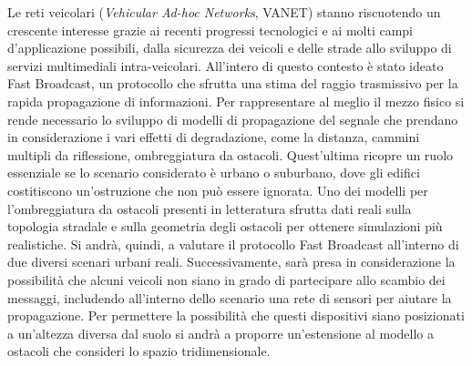 
Le reti veicolari (\textit{Vehicular Ad-hoc Networks}, VANET) stanno riscuotendo un crescente interesse
grazie ai recenti progressi tecnologici e ai molti campi d'applicazione possibili, dalla sicurezza dei veicoli
e delle strade allo sviluppo di servizi multimediali intra-veicolari.
All'intero di questo contesto è stato ideato Fast Broadcast,
un protocollo che sfrutta una stima del raggio trasmissivo per la rapida propagazione di informazioni.
Per rappresentare al meglio il mezzo fisico si rende necessario lo sviluppo di modelli di propagazione del segnale
che prendano in considerazione i vari effetti di degradazione, come la distanza, cammini multipli da riflessione, ombreggiatura da ostacoli.
Quest'ultima ricopre un ruolo essenziale se lo scenario considerato è urbano o suburbano,
dove gli edifici costitiscono un'ostruzione che non può essere ignorata.
Uno dei modelli per l'ombreggiatura da ostacoli presenti in letteratura
sfrutta dati reali sulla topologia stradale e sulla geometria degli ostacoli per ottenere simulazioni più realistiche.
Si andrà, quindi, a valutare il protocollo Fast Broadcast all'interno di due diversi scenari urbani reali.
Successivamente, sarà presa in considerazione la possibilità che alcuni veicoli non siano in grado
di partecipare allo scambio dei messaggi, includendo all'interno dello scenario
una rete di sensori per aiutare la propagazione.
Per permettere la possibilità che questi dispositivi siano posizionati a un'altezza diversa dal suolo
si andrà a proporre un'estensione al modello a ostacoli che consideri lo spazio tridimensionale.
